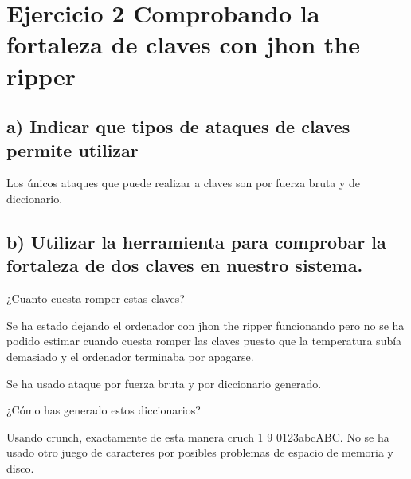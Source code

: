 \documentclass[a4paper]{article}
\begin{document}
\section{Ejercicio 2  Comprobando la fortaleza de claves con jhon the ripper}

\subsection{ a) Indicar que tipos de ataques de claves permite utilizar }

Los únicos ataques que puede realizar a claves son por fuerza bruta y de diccionario. 


\subsection{ b) Utilizar la herramienta para comprobar la fortaleza de dos claves en nuestro sistema.}

¿Cuanto cuesta romper estas claves?

Se ha estado dejando el ordenador con jhon the ripper funcionando pero no se ha podido estimar cuando cuesta romper las claves puesto que la temperatura subía demasiado y el ordenador terminaba por apagarse.

Se ha usado ataque por fuerza bruta y por diccionario generado.

¿Cómo has generado estos diccionarios?
 
Usando crunch, exactamente de esta manera cruch 1 9 0123abcABC. No se ha usado otro juego de caracteres por posibles problemas de espacio de memoria y disco.
\end{document}
